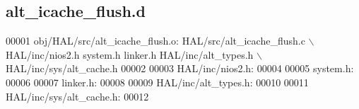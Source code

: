 \subsection{alt\+\_\+icache\+\_\+flush.\+d}
\label{alt__icache__flush_8d_source}

\begin{DoxyCode}
00001 obj/HAL/src/alt_icache_flush.o: HAL/src/alt_icache_flush.c \(\backslash\)
 HAL/inc/nios2.h system.h linker.h HAL/inc/alt\_types.h \(\backslash\)
 HAL/inc/sys/alt\_cache.h
00002 
00003 HAL/inc/nios2.h:
00004 
00005 system.h:
00006 
00007 linker.h:
00008 
00009 HAL/inc/alt\_types.h:
00010 
00011 HAL/inc/sys/alt\_cache.h:
00012 \end{DoxyCode}
